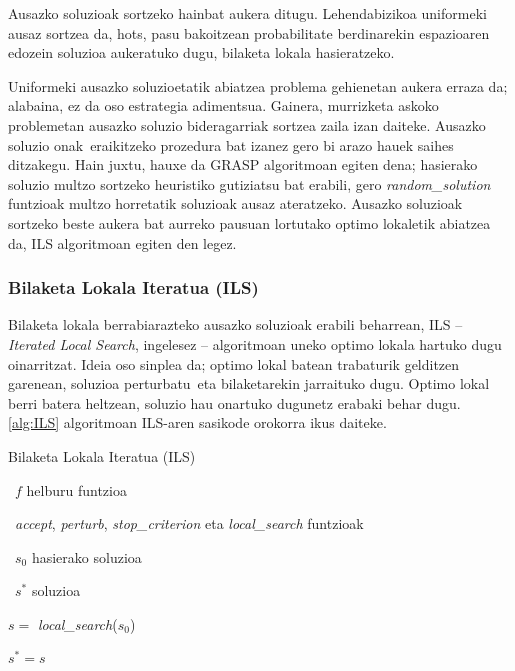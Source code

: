 \documentclass[eu]{ifirak}\usepackage[]{graphicx}\usepackage[]{color}
\newcommand{\zkk}{\guillemotleft}
\newcommand{\skk}{\guillemotright}
\begin{document}
Ausazko soluzioak sortzeko hainbat aukera ditugu. Lehendabizikoa uniformeki ausaz sortzea da, hots, pasu bakoitzean probabilitate berdinarekin espazioaren edozein soluzioa aukeratuko dugu, bilaketa lokala hasieratzeko. 

Uniformeki ausazko soluzioetatik abiatzea problema gehienetan aukera erraza da; alabaina, ez da oso estrategia adimentsua. Gainera, murrizketa askoko problemetan ausazko soluzio bideragarriak sortzea zaila izan daiteke. Ausazko soluzio \zkk onak\skk\ eraikitzeko prozedura bat izanez gero bi arazo hauek saihes ditzakegu. Hain juxtu, hauxe da GRASP algoritmoan egiten dena; hasierako soluzio multzo sortzeko heuristiko gutiziatsu bat erabili, gero \textit{random\_solution} funtzioak multzo horretatik soluzioak ausaz ateratzeko. Ausazko soluzioak sortzeko beste aukera bat aurreko pausuan lortutako optimo lokaletik abiatzea da, ILS algoritmoan egiten den legez.


\subsubsection{Bilaketa Lokala Iteratua (ILS)}

Bilaketa lokala berrabiarazteko ausazko soluzioak erabili beharrean, ILS -- \textit{Iterated Local Search}, ingelesez -- algoritmoan uneko optimo lokala hartuko dugu oinarritzat. Ideia oso sinplea da; optimo lokal batean trabaturik gelditzen garenean, soluzioa \zkk perturbatu\skk\ eta bilaketarekin jarraituko dugu. Optimo lokal berri batera heltzean, soluzio hau onartuko dugunetz erabaki behar dugu. \ref{alg:ILS} algoritmoan ILS-aren sasikode orokorra ikus daiteke.

\begin{ifalgorithm}[t]
\begin{ifpseudo}{Bilaketa Lokala Iteratua (ILS)}
\item \In\ $f$ helburu funtzioa
\item \In\ \textit{accept}, \textit{perturb}, \textit{stop\_criterion} eta \textit{local\_search} funtzioak
\item \In\ $s_0$ hasierako soluzioa
\item \Out\ $s^*$ soluzioa
\item $s = $ \textit{local\_search}($s_0$)
\item $s^* = s$
\item {}
\item {}
\item {}
\item {}
\item {}
\item \Done
\end{ifpseudo}
\caption{Bilaketa Lokala Iteratuaren (ILS) sasikodea}\label{alg:ILS}
\end{ifalgorithm}
\end{document}
